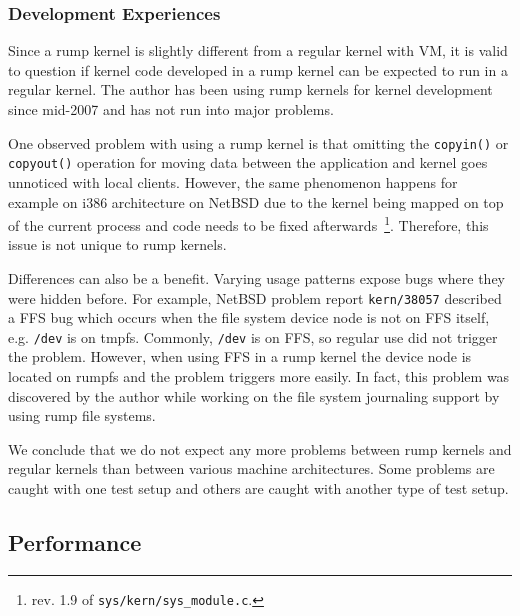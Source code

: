 \subsubsection{Development Experiences}

Since a rump kernel is slightly different from a regular kernel
\eg with VM, it is valid to question if kernel code developed in
a rump kernel can be expected to run in a regular kernel.  The
author has been using rump kernels for kernel development since
mid-2007 and has not run into major problems.

One observed problem with using a rump kernel is that omitting
the \texttt{copyin()} or \texttt{copyout()} operation for moving
data between the application and kernel goes unnoticed with local
clients.  However, the same phenomenon happens for example on i386
architecture on NetBSD due to the kernel being mapped on top of
the current process and code needs to be fixed afterwards~\footnote
{
	\eg rev. 1.9 of \texttt{sys/kern/sys\_module.c}.
}.
Therefore, this issue is not unique to rump kernels.

Differences can also be a benefit.  Varying usage patterns expose
bugs where they were hidden before.  For example, NetBSD problem
report \texttt{kern/38057} described a FFS bug which occurs when
the file system device node is not on FFS itself, e.g. \texttt{/dev}
is on tmpfs.  Commonly, \texttt{/dev} is on FFS, so regular use did
not trigger the problem.  However, when using
FFS in a rump kernel the device node is located on
rumpfs and the problem triggers more easily.  In fact,
this problem was discovered by the author while working on the file
system journaling support by using rump file systems.

We conclude that we do not expect any more problems between rump
kernels and regular kernels than between various machine architectures.
Some problems are caught with one test setup and others are caught
with another type of test setup.

\subsection{Performance}

